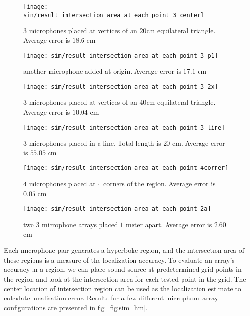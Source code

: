 \begin{figure*}[]
  \centering
  \begin{subfigure}[]{.3\textwidth}
    \texttt{[image: sim/result\_intersection\_area\_at\_each\_point\_3\_center]}
    \caption{$3$ microphones placed at vertices of an $20$cm equilateral triangle. Average error is $18.6$ cm}
    \label{fig:sim_hm_3}
  \end{subfigure}
  \begin{subfigure}[]{.3\textwidth}
    \texttt{[image: sim/result\_intersection\_area\_at\_each\_point\_3\_p1]}
    \caption{another microphone added at origin. Average error is $17.1$ cm}
    \label{fig:sim_hm_3_p1}
  \end{subfigure}
  \begin{subfigure}[]{.3\textwidth}
    \texttt{[image: sim/result\_intersection\_area\_at\_each\_point\_3\_2x]}
    \caption{$3$ microphones placed at vertices of an $40$cm equilateral triangle. Average error is $10.04$ cm}
    \label{fig:sim_hm_3_2x}
  \end{subfigure}
  \begin{subfigure}[]{.3\textwidth}
    \texttt{[image: sim/result\_intersection\_area\_at\_each\_point\_3\_line]}
    \caption{$3$ microphones placed in a line. Total length is $20$ cm. Average error is $55.05$ cm}
    \label{fig:sim_hm_3_line}
  \end{subfigure}
  \begin{subfigure}[]{.3\textwidth}
    \texttt{[image: sim/result\_intersection\_area\_at\_each\_point\_4corner]}
    \caption{$4$ microphones placed at $4$ corners of the region. Average error is $0.05$ cm}
    \label{fig:sim_hm_4}
  \end{subfigure}
  \begin{subfigure}[]{.3\textwidth}
    \texttt{[image: sim/result\_intersection\_area\_at\_each\_point\_2a]}
    \caption{two $3$ microphone arrays placed $1$ meter apart. Average error is $2.60$ cm}
    \label{fig:sim_hm_2_array}
  \end{subfigure}
  \caption{Accuracy for different array configurations}
  \label{fig:sim_hm}
\end{figure*}

Each microphone pair generates a hyperbolic region, and the intersection area of these regions is a measure of the localization accuracy. To evaluate an array's accuracy in a region, we can place sound source at predetermined grid points in the region and look at the intersection area for each tested point in the grid. The center location of intersection region can be used as the localization estimate to calculate localization error. Results for a few different microphone array configurations are presented in fig~\ref{fig:sim_hm}.

